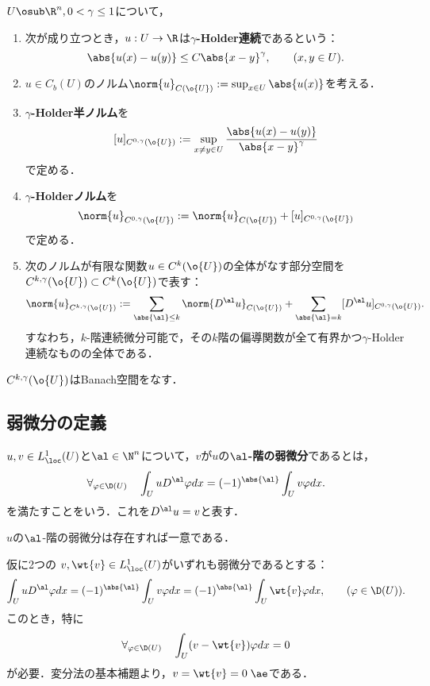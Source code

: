 \documentclass[uplatex,dvipdfmx]{jsreport}
\begin{document}
\begin{definition}
    $U\osub\R^n,0<\gamma\le1$について，
    \begin{enumerate}
        \item 次が成り立つとき，$u:U\to\R$は\textbf{$\gamma$-Holder連続}であるという：
        \[\abs{u(x)-u(y)}\le C\abs{x-y}^\gamma,\qquad(x,y\in U).\]
        \item $u\in C_b(U)$のノルム$\norm{u}_{C(\o{U})}:=\sup_{x\in U}\abs{u(x)}$を考える．
        \item \textbf{$\gamma$-Holder半ノルム}を
        \[[u]_{C^{0,\gamma}(\o{U})}:=\sup_{x\ne y\in U}\frac{\abs{u(x)-u(y)}}{\abs{x-y}^\gamma}\]
        で定める．
        \item \textbf{$\gamma$-Holderノルム}を
        \[\norm{u}_{C^{0,\gamma}(\o{U})}:=\norm{u}_{C(\o{U})}+[u]_{C^{0,\gamma}(\o{U})}\]
        で定める．
        \item 次のノルムが有限な関数$u\in C^k(\o{U})$の全体がなす部分空間を$C^{k,\gamma}(\o{U})\subset C^k(\o{U})$で表す：
        \[\norm{u}_{C^{k,\gamma}(\o{U})}:=\sum_{\abs{\al}\le k}\norm{D^\al u}_{C(\o{U})}+\sum_{\abs{\al}=k}[D^\al u]_{C^{0,\gamma}(\o{U})}.\]
        すなわち，$k$-階連続微分可能で，その$k$階の偏導関数が全て有界かつ$\gamma$-Holder連続なものの全体である．
    \end{enumerate}
\end{definition}

\begin{theorem}
    $C^{k,\gamma}(\o{U})$はBanach空間をなす．
\end{theorem}

\subsection{弱微分の定義}

\begin{definition}
    $u,v\in L^1_\loc(U)$と$\al\in\N^n$について，$v$が$u$の\textbf{$\al$-階の弱微分}であるとは，
    \[\forall_{\varphi\in\D(U)}\quad\int_UuD^\al\varphi dx=(-1)^{\abs{\al}}\int_Uv\varphi dx.\]
    を満たすことをいう．これを$D^\al u=v$と表す．
\end{definition}

\begin{lemma}[弱微分の一意性]
    $u$の$\al$-階の弱微分は存在すれば一意である．
\end{lemma}
\begin{Proof}
    仮に2つの
    $v,\wt{v}\in L^1_\loc(U)$がいずれも弱微分であるとする：
    \[\int_UuD^\al\varphi dx=(-1)^{\abs{\al}}\int_Uv\varphi dx=(-1)^{\abs{\al}}\int_U\wt{v}\varphi dx,\qquad(\varphi\in\D(U)).\]
    このとき，特に
    \[\forall_{\varphi\in\D(U)}\quad\int_U(v-\wt{v})\varphi dx=0\]
    が必要．変分法の基本補題より，$v=\wt{v}=0\;\ae$である．
\end{Proof}
\end{document}
